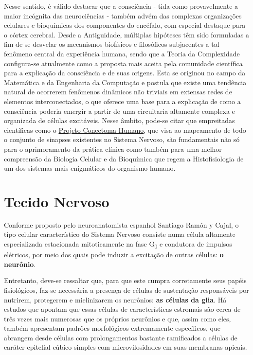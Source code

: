 \documentclass[
]{book}
\begin{document}
Nesse sentido, é válido destacar que a consciência - tida como provavelmente a maior incógnita das neurociências - também advém das complexas organizações celulares e bioquímicas dos componentes do encéfalo, com especial destaque para o córtex cerebral. Desde a Antiguidade, múltiplas hipóteses têm sido formuladas a fim de se desvelar os mecanismos biofísicos e filosóficos subjacentes a tal fenômeno central da experiência humana, sendo que a Teoria da Complexidade configura-se atualmente como a proposta mais aceita pela comunidade científica para a explicação da consciência e de suas origens. Esta se originou no campo da Matemática e da Engenharia da Computação e postula que existe uma tendência natural de ocorrerem fenômenos dinâmicos não triviais em extensas redes de elementos interconectados, o que oferece uma base para a explicação de como a consciência poderia emergir a partir de uma circuitaria altamente complexa e organizada de células excitáveis. Nesse âmbito, pode-se citar que empreitadas científicas como o \href{https://www.humanconnectome.org/}{Projeto Conectoma Humano}, que visa ao mapeamento de todo o conjunto de sinapses existentes no Sistema Nervoso, são fundamentais não só para o aprimoramento da prática clínica como também para uma melhor compreensão da Biologia Celular e da Bioquímica que regem a Histofisiologia de um dos sistemas mais enigmáticos do organismo humano.

\hypertarget{tecido-nervoso}{%
\section{Tecido Nervoso}\label{tecido-nervoso}}

Conforme proposto pelo neuroanatomista espanhol Santiago Ramón y Cajal, o tipo celular característico do Sistema Nervoso consiste numa célula altamente especializada estacionada mitoticamente na fase G\textsubscript{0} e condutora de impulsos elétricos, por meio dos quais pode induzir a excitação de outras células: \textbf{o neurônio}.

Entretanto, deve-se ressaltar que, para que este cumpra corretamente seus papéis fisiológicos, faz-se necessária a presença de células de sustentação responsáveis por nutrirem, protegerem e mielinizarem os neurônios: \textbf{as células da glia}. Há estudos que apontam que essas células de características estromais são cerca de três vezes mais numerosas que os próprios neurônios e que, assim como eles, também apresentam padrões morfológicos extremamente específicos, que abrangem desde células com prolongamentos bastante ramificados a células de caráter epitelial cúbico simples com microvilosidades em suas membranas apicais.
\end{document}
